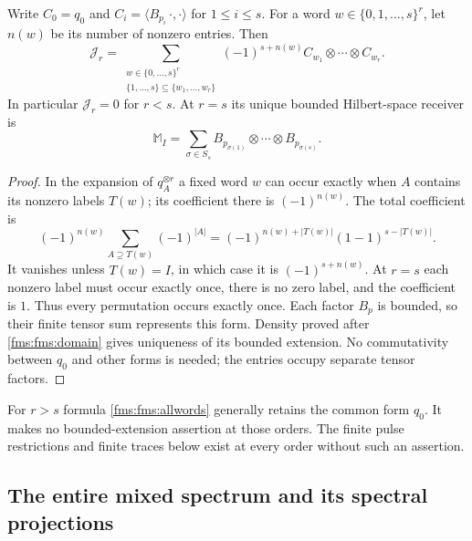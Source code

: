 \begin{proposition}\label{fms:fms:subset}
Write $C_0=q_0$ and
$C_i=\langle B_{p_i}\,\cdot,\cdot\rangle$ for $1\le i\le s$.
For a word $w\in\{0,1,\ldots,s\}^r$, let $n(w)$ be its number
of nonzero entries. Then
\begin{equation}\tag{FMS13}\label{fms:fms:allwords}
 \mathcal J_r=
 \sum_{\substack{w\in\{0,\ldots,s\}^r\\
                  \{1,\ldots,s\}\subseteq\{w_1,\ldots,w_r\}}}
       (-1)^{s+n(w)}C_{w_1}\otimes\cdots\otimes C_{w_r}.
\end{equation}
In particular $\mathcal J_r=0$ for $r<s$. At $r=s$ its unique
bounded Hilbert-space receiver is
\begin{equation}\tag{FMS14}\label{fms:fms:mixedoperator}
 \mathbb M_I=\sum_{\sigma\in S_s}
        B_{p_{\sigma(1)}}\otimes\cdots\otimes B_{p_{\sigma(s)}}.
\end{equation}
\end{proposition}
\begin{proof}
In the expansion of $q_A^{\otimes r}$ a fixed word $w$ can occur
exactly when $A$ contains its nonzero labels $T(w)$; its coefficient
there is $(-1)^{n(w)}$. The total coefficient is
\[
 (-1)^{n(w)}\sum_{A\supseteq T(w)}(-1)^{|A|}
 =(-1)^{n(w)+|T(w)|}(1-1)^{s-|T(w)|}.
\]
It vanishes unless $T(w)=I$, in which case it is
$(-1)^{s+n(w)}$.  At $r=s$ each nonzero label must occur exactly
once, there is no zero label, and the coefficient is $1$.
Thus every permutation occurs exactly once. Each factor $B_p$ is
bounded, so their finite tensor sum represents this form. Density
proved after \eqref{fms:fms:domain} gives uniqueness of its bounded
extension. No commutativity between $q_0$ and other forms is needed;
the entries occupy separate tensor factors.
\end{proof}

For $r>s$ formula \eqref{fms:fms:allwords} generally retains the common
form $q_0$. It makes no bounded-extension assertion at those orders.
The finite pulse restrictions and finite traces below exist at every
order without such an assertion.

\subsection{The entire mixed spectrum and its spectral projections}

